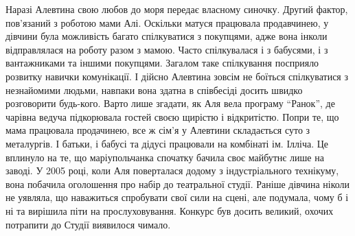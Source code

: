 
Наразі Алевтина свою любов до моря  передає власному синочку. Другий фактор,
пов'язаний з роботою мами Алі. Оскільки матуся працювала продавчинею, у дівчини
була можливість багато спілкуватися з покупцями, адже вона інколи відправлялася
на роботу разом з мамою. Часто спілкувалася і з бабусями, і з вантажниками та
іншими покупцями. Загалом таке спілкування посприяло розвитку навички
комунікації. І дійсно Алевтина зовсім не боїться спілкуватися з незнайомими
людьми, навпаки вона здатна в співбесіді досить швидко розговорити будь-кого.
Варто лише згадати, як Аля вела програму \enquote{Ранок}, де чарівна ведуча підкорювала
гостей своєю щирістю і відкритістю. Попри те, що мама працювала продачинею, все
ж сім'я у Алевтини складається суто з металургів. І батьки, і бабусі та дідусі
працювали на комбінаті ім. Ілліча. Це вплинуло на те, що маріупольчанка
спочатку бачила своє майбутнє лише на заводі. У 2005 році, коли Аля поверталася
додому з індустріального технікуму, вона побачила  оголошення про набір до
театральної студії. Раніше дівчина ніколи не уявляла, що наважиться спробувати
свої сили на сцені, але подумала, чому б і ні та вирішила піти на
прослуховування. Конкурс був досить великий, охочих потрапити до Студії
виявилося чимало.

